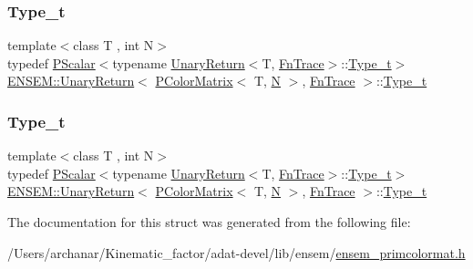 \subsubsection{\texorpdfstring{Type\_t}{Type\_t}\hspace{0.1cm}{\footnotesize\ttfamily [2/3]}}
{\footnotesize\ttfamily template$<$class T , int N$>$ \\
typedef \mbox{\hyperlink{classENSEM_1_1PScalar}{P\+Scalar}}$<$typename \mbox{\hyperlink{structENSEM_1_1UnaryReturn}{Unary\+Return}}$<$T, \mbox{\hyperlink{structENSEM_1_1FnTrace}{Fn\+Trace}}$>$\+::\mbox{\hyperlink{structENSEM_1_1UnaryReturn_3_01PColorMatrix_3_01T_00_01N_01_4_00_01FnTrace_01_4_a828cd28979c532a4fc47110bdc5d9fdb}{Type\+\_\+t}}$>$ \mbox{\hyperlink{structENSEM_1_1UnaryReturn}{E\+N\+S\+E\+M\+::\+Unary\+Return}}$<$ \mbox{\hyperlink{classENSEM_1_1PColorMatrix}{P\+Color\+Matrix}}$<$ T, \mbox{\hyperlink{adat__devel_2lib_2hadron_2operator__name__util_8cc_a7722c8ecbb62d99aee7ce68b1752f337}{N}} $>$, \mbox{\hyperlink{structENSEM_1_1FnTrace}{Fn\+Trace}} $>$\+::\mbox{\hyperlink{structENSEM_1_1UnaryReturn_3_01PColorMatrix_3_01T_00_01N_01_4_00_01FnTrace_01_4_a828cd28979c532a4fc47110bdc5d9fdb}{Type\+\_\+t}}}

\mbox{\label{structENSEM_1_1UnaryReturn_3_01PColorMatrix_3_01T_00_01N_01_4_00_01FnTrace_01_4_a828cd28979c532a4fc47110bdc5d9fdb}} 
\subsubsection{\texorpdfstring{Type\_t}{Type\_t}\hspace{0.1cm}{\footnotesize\ttfamily [3/3]}}
{\footnotesize\ttfamily template$<$class T , int N$>$ \\
typedef \mbox{\hyperlink{classENSEM_1_1PScalar}{P\+Scalar}}$<$typename \mbox{\hyperlink{structENSEM_1_1UnaryReturn}{Unary\+Return}}$<$T, \mbox{\hyperlink{structENSEM_1_1FnTrace}{Fn\+Trace}}$>$\+::\mbox{\hyperlink{structENSEM_1_1UnaryReturn_3_01PColorMatrix_3_01T_00_01N_01_4_00_01FnTrace_01_4_a828cd28979c532a4fc47110bdc5d9fdb}{Type\+\_\+t}}$>$ \mbox{\hyperlink{structENSEM_1_1UnaryReturn}{E\+N\+S\+E\+M\+::\+Unary\+Return}}$<$ \mbox{\hyperlink{classENSEM_1_1PColorMatrix}{P\+Color\+Matrix}}$<$ T, \mbox{\hyperlink{adat__devel_2lib_2hadron_2operator__name__util_8cc_a7722c8ecbb62d99aee7ce68b1752f337}{N}} $>$, \mbox{\hyperlink{structENSEM_1_1FnTrace}{Fn\+Trace}} $>$\+::\mbox{\hyperlink{structENSEM_1_1UnaryReturn_3_01PColorMatrix_3_01T_00_01N_01_4_00_01FnTrace_01_4_a828cd28979c532a4fc47110bdc5d9fdb}{Type\+\_\+t}}}



The documentation for this struct was generated from the following file\+:\begin{DoxyCompactItemize}
\item 
/\+Users/archanar/\+Kinematic\+\_\+factor/adat-\/devel/lib/ensem/\mbox{\hyperlink{adat-devel_2lib_2ensem_2ensem__primcolormat_8h}{ensem\+\_\+primcolormat.\+h}}\end{DoxyCompactItemize}
